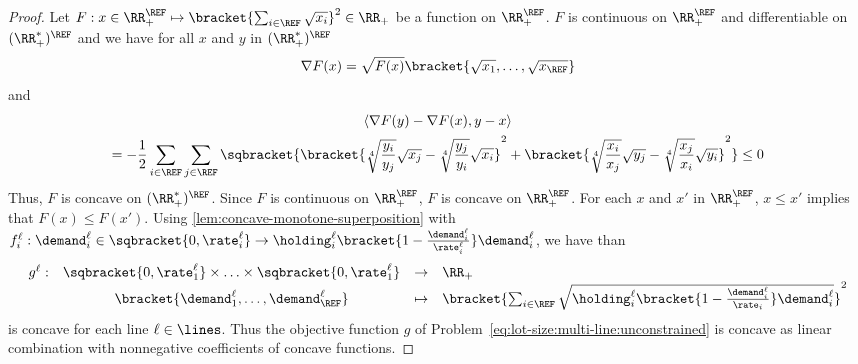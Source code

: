 \begin{proof}%
Let $F: x\in\RR_+^{\REF} \mapsto \bracket{\sum_{i\in\REF} \sqrt{x_i}}^2 \in \RR_+$ be a function on $\RR_+^{\REF}$.
$F$ is continuous on $\RR_+^{\REF}$ and differentiable on $(\RR_+^*)^{\REF}$ and we have for all $x$ and $y$ in $(\RR_+^*)^{\REF}$
\begin{equation}
  \nabla F(x) = \sqrt{F(x)}\bracket{\sqrt{x_1},\ldots,\sqrt{x_{\REF}}}
\end{equation}
and
\begin{multline}
\left<\nabla F(y)-\nabla F(x),y-x\right>
\\
=
-\frac{1}{2}\sum_{i\in\REF}\sum_{j\in\REF}
\sqbracket
{
  \bracket{ \sqrt[4]{\frac{y_i}{y_j}}\sqrt{x_j} - \sqrt[4]{\frac{y_j}{y_i}}\sqrt{x_i} }^2
  +
  \bracket{ \sqrt[4]{\frac{x_i}{x_j}}\sqrt{y_j} - \sqrt[4]{\frac{x_j}{x_i}}\sqrt{y_i} }^2
}
\le 0
\end{multline}
Thus, $F$ is concave on $(\RR_+^*)^{\REF}$.
Since $F$ is continuous on $\RR_+^{\REF}$, $F$ is concave on $\RR_+^{\REF}$.
For each $x$ and $x'$ in $\RR_+^{\REF}$, $x\le x'$ implies that $F(x)\le F(x')$.
Using \cref{lem:concave-monotone-superposition} with $f_i^{\ell}:\demand_i^{\ell}\in\sqbracket{0,\rate_i^{\ell}}\to\holding_i^{\ell}\bracket{1-\frac{\demand_i^{\ell}}{\rate_i^{\ell}}}\demand_i^{\ell}$, we have than 
\begin{equation}
\begin{array}{rccl}
  g^{\ell}: & \sqbracket{0,\rate_1^{\ell}}\times\ldots\times\sqbracket{0,\rate_1^{\ell}} & \to     & \RR_+ \\
            & \bracket{\demand_1^{\ell},\ldots,\demand_{\REF}^{\ell}} & \mapsto & \bracket{\sum_{i\in\REF}\sqrt{\holding_i^{\ell}\bracket{1-\frac{\demand_i^{\ell}}{\rate_i}}\demand_i^{\ell}}}^2
\end{array}
\end{equation}
is concave for each line $\ell\in\lines$.
Thus the objective function $g$ of Problem~\eqref{eq:lot-size:multi-line:unconstrained} is concave as linear combination with nonnegative coefficients of concave functions.
\end{proof}


